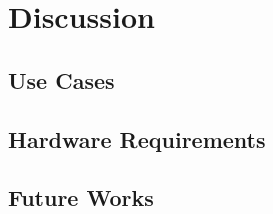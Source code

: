 
\chapter{Discussion} %

\label{Chapter7} %

% 




\section{Use Cases}


\section{Hardware Requirements}

\section{Future Works}



